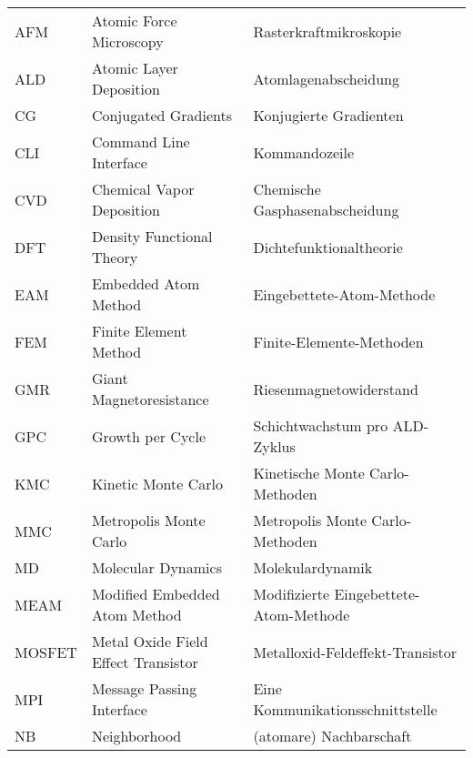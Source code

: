 \def\arraystretch{1.3}
\begin{longtable}{lll}

AFM       & Atomic Force Microscopy             & Rasterkraftmikroskopie                                      \\
ALD       & Atomic Layer Deposition             & Atomlagenabscheidung                                        \\
CG        & Conjugated Gradients                & Konjugierte Gradienten                                      \\
CLI       & Command Line Interface              & Kommandozeile                                               \\
CVD       & Chemical Vapor Deposition           & Chemische Gasphasenabscheidung                              \\
DFT       & Density Functional Theory           & Dichtefunktionaltheorie                                     \\
EAM       & Embedded Atom Method                & Eingebettete-Atom-Methode                                   \\
FEM       & Finite Element Method               & Finite-Elemente-Methoden                                    \\
GMR       & Giant Magnetoresistance             & Riesenmagnetowiderstand                                     \\
GPC       & Growth per Cycle                    & Schichtwachstum pro ALD-Zyklus                              \\
KMC       & Kinetic Monte Carlo                 & Kinetische Monte Carlo-Methoden                             \\
MMC       & Metropolis Monte Carlo              & Metropolis Monte Carlo-Methoden                             \\
MD        & Molecular Dynamics                  & Molekulardynamik                                            \\
MEAM      & Modified Embedded Atom Method       & Modifizierte Eingebettete-Atom-Methode                      \\
MOSFET    & Metal Oxide Field Effect Transistor & Metalloxid-Feldeffekt-Transistor                            \\
MPI       & Message Passing Interface           & Eine Kommunikationsschnittstelle                            \\
NB        & Neighborhood                        & (atomare) Nachbarschaft                                     \\

\end{longtable}
